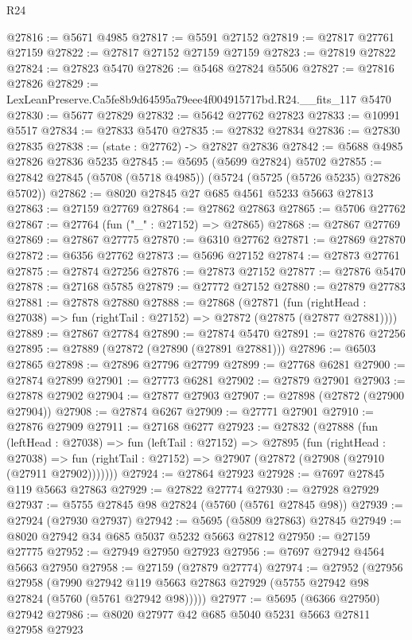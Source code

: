 \begin{lexlean}{R24}
\begin{coremodule}
@27816 := @5671 @4985
@27817 := @5591 @27152
@27819 := @27817 @27761 @27159
@27822 := @27817 @27152 @27159 @27159
@27823 := @27819 @27822
@27824 := @27823 @5470
@27826 := @5468 @27824 @5506
@27827 := @27816 @27826
@27829 := LexLeanPreserve.Ca5fe8b9d64595a79eee4f004915717bd.R24.__fits_117 @5470
@27830 := @5677 @27829
@27832 := @5642 @27762 @27823
@27833 := @10991 @5517
@27834 := @27833 @5470
@27835 := @27832 @27834
@27836 := @27830 @27835
@27838 := (state : @27762) -> @27827 @27836
@27842 := @5688 @4985 @27826 @27836 @5235
@27845 := @5695 (@5699 @27824) @5702
@27855 := @27842 @27845 (@5708 (@5718 @4985)) (@5724 (@5725 (@5726 @5235) @27826 @5702))
@27862 := @8020 @27845 @27 @685 @4561 @5233 @5663 @27813
@27863 := @27159 @27769
@27864 := @27862 @27863
@27865 := @5706 @27762
@27867 := @27764 (fun ("_" : @27152) => @27865)
@27868 := @27867 @27769
@27869 := @27867 @27775
@27870 := @6310 @27762
@27871 := @27869 @27870
@27872 := @6356 @27762
@27873 := @5696 @27152
@27874 := @27873 @27761
@27875 := @27874 @27256
@27876 := @27873 @27152
@27877 := @27876 @5470
@27878 := @27168 @5785
@27879 := @27772 @27152
@27880 := @27879 @27783
@27881 := @27878 @27880
@27888 := @27868
    (@27871
      (fun (rightHead : @27038) => fun (rightTail : @27152) => @27872 (@27875 (@27877 @27881))))
@27889 := @27867 @27784
@27890 := @27874 @5470
@27891 := @27876 @27256
@27895 := @27889 (@27872 (@27890 (@27891 @27881)))
@27896 := @6503 @27865
@27898 := @27896 @27796 @27799
@27899 := @27768 @6281
@27900 := @27874 @27899
@27901 := @27773 @6281
@27902 := @27879 @27901
@27903 := @27878 @27902
@27904 := @27877 @27903
@27907 := @27898 (@27872 (@27900 @27904))
@27908 := @27874 @6267
@27909 := @27771 @27901
@27910 := @27876 @27909
@27911 := @27168 @6277
@27923 := @27832
    (@27888
      (fun (leftHead : @27038) =>
      fun (leftTail : @27152) =>
      @27895
        (fun (rightHead : @27038) =>
        fun (rightTail : @27152) => @27907 (@27872 (@27908 (@27910 (@27911 @27902)))))))
@27924 := @27864 @27923
@27928 := @7697 @27845 @119 @5663 @27863
@27929 := @27822 @27774
@27930 := @27928 @27929
@27937 := @5755 @27845 @98 @27824 (@5760 (@5761 @27845 @98))
@27939 := @27924 (@27930 @27937)
@27942 := @5695 (@5809 @27863) @27845
@27949 := @8020 @27942 @34 @685 @5037 @5232 @5663 @27812
@27950 := @27159 @27775
@27952 := @27949 @27950 @27923
@27956 := @7697 @27942 @4564 @5663 @27950
@27958 := @27159 (@27879 @27774)
@27974 := @27952
    (@27956
      @27958
      (@7990 @27942 @119 @5663 @27863 @27929 (@5755 @27942 @98 @27824 (@5760 (@5761 @27942 @98)))))
@27977 := @5695 (@6366 @27950) @27942
@27986 := @8020 @27977 @42 @685 @5040 @5231 @5663 @27811 @27958 @27923

\end{coremodule}
\end{lexlean}
